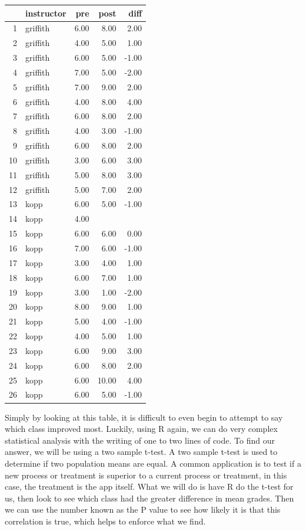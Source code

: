 \documentclass[titlepage]{article}\usepackage[]{graphicx}\usepackage[]{color}
\begin{document}
% 
\begin{tabular}{rlrrr}
  \hline
 & instructor & pre & post & diff \\ 
  \hline
1 & griffith & 6.00 & 8.00 & 2.00 \\ 
  2 & griffith & 4.00 & 5.00 & 1.00 \\ 
  3 & griffith & 6.00 & 5.00 & -1.00 \\ 
  4 & griffith & 7.00 & 5.00 & -2.00 \\ 
  5 & griffith & 7.00 & 9.00 & 2.00 \\ 
  6 & griffith & 4.00 & 8.00 & 4.00 \\ 
  7 & griffith & 6.00 & 8.00 & 2.00 \\ 
  8 & griffith & 4.00 & 3.00 & -1.00 \\ 
  9 & griffith & 6.00 & 8.00 & 2.00 \\ 
  10 & griffith & 3.00 & 6.00 & 3.00 \\ 
  11 & griffith & 5.00 & 8.00 & 3.00 \\ 
  12 & griffith & 5.00 & 7.00 & 2.00 \\ 
  13 & kopp & 6.00 & 5.00 & -1.00 \\ 
  14 & kopp & 4.00 &  &  \\ 
  15 & kopp & 6.00 & 6.00 & 0.00 \\ 
  16 & kopp & 7.00 & 6.00 & -1.00 \\ 
  17 & kopp & 3.00 & 4.00 & 1.00 \\ 
  18 & kopp & 6.00 & 7.00 & 1.00 \\ 
  19 & kopp & 3.00 & 1.00 & -2.00 \\ 
  20 & kopp & 8.00 & 9.00 & 1.00 \\ 
  21 & kopp & 5.00 & 4.00 & -1.00 \\ 
  22 & kopp & 4.00 & 5.00 & 1.00 \\ 
  23 & kopp & 6.00 & 9.00 & 3.00 \\ 
  24 & kopp & 6.00 & 8.00 & 2.00 \\ 
  25 & kopp & 6.00 & 10.00 & 4.00 \\ 
  26 & kopp & 6.00 & 5.00 & -1.00 \\ 
   \hline
\end{tabular}


\bigskip

Simply by looking at this table, it is difficult to even begin to attempt to say which class improved most. Luckily, using R again, we can do very complex statistical analysis with the writing of one to two lines of code. To find our answer, we will be using a two sample t-test. A two sample t-test is used to determine if two population means are equal. A common application is to test if a new process or treatment is superior to a current process or treatment, in this case, the treatment is the app itself. What we will do is have R do the t-test for us, then look to see which class had the greater difference in mean grades. Then we can use the number known as the P value to see how likely it is that this correlation is true, which helps to enforce what we find.
\end{document}
